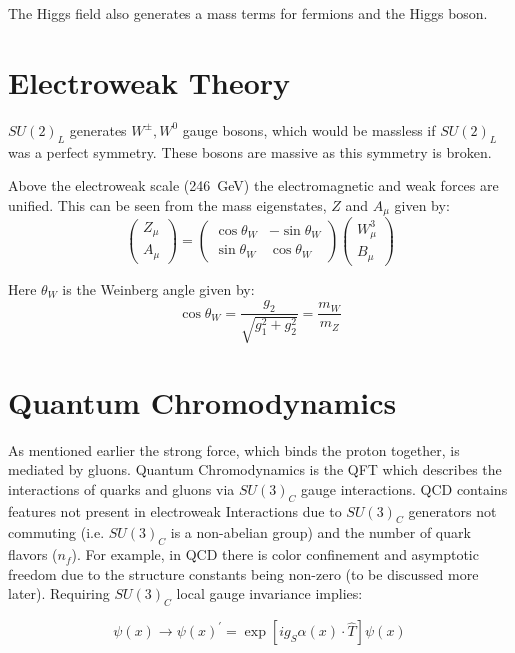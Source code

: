 The Higgs field also generates a mass terms for fermions and the Higgs boson.
\section{Electroweak Theory}
$SU(2)_{L}$ generates $W^{\pm}, W^{0}$ gauge bosons, which would be massless if $SU(2)_{L}$ was a perfect symmetry. These bosons are massive as this symmetry is broken. 

Above the electroweak scale (246~GeV) the electromagnetic and weak forces are unified. This can be seen from the mass eigenstates, $Z$ and $A_{\mu}$ given by: 
\begin{equation}
\begin{pmatrix} Z_{\mu} \\ A_{\mu} \end{pmatrix} = \begin{pmatrix} \cos \theta_{W} & -\sin \theta_{W} \\ \sin \theta_{W} & \cos \theta_{W} \end{pmatrix} \begin{pmatrix} W^{3}_{\mu} \\ B_{\mu} \end{pmatrix}
\end{equation} 

Here $\theta_{W}$ is the Weinberg angle given by: 
\begin{equation}
\cos\theta_{W}=\frac{g_{2}}{\sqrt{g_{1}^{2}+g_{2}^{2}}} = \frac{m_{W}}{m_{Z}}
\end{equation}
\section{Quantum Chromodynamics}
As mentioned earlier the strong force, which binds the proton together, is mediated by gluons. Quantum Chromodynamics is the QFT which describes the interactions of quarks and gluons via $SU(3)_C$ gauge interactions. QCD contains features not present in electroweak Interactions due to $SU(3)_C$ generators not commuting (i.e. $SU(3)_C$ is a non-abelian group) and the number of quark flavors ($n_{f}$). For example, in QCD there is color confinement and asymptotic freedom due to the structure constants being non-zero (to be discussed more later). Requiring $SU(3)_C$ local gauge invariance implies:

\begin{equation}
\psi(x) \rightarrow \psi(x)^{'} = \exp[ig_{S}\alpha(x)\cdot\hat{T}]\psi(x)
\end{equation}

